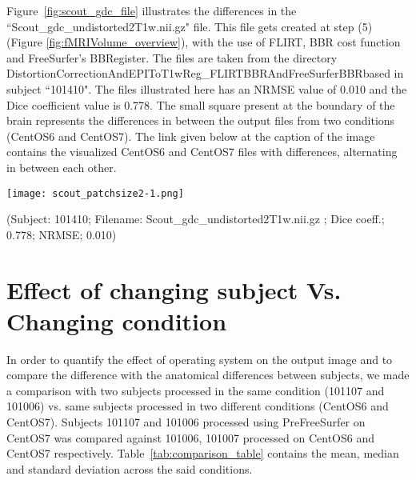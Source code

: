 Figure~\ref{fig:scout_gdc_file} illustrates the differences in the ``Scout\_gdc\_undistorted2T1w.nii.gz" file. This file gets created at step (5) (Figure \ref{fig:fMRIVolume_overview}), with the use of FLIRT, BBR cost function and FreeSurfer's BBRegister. The files are taken from the directory DistortionCorrectionAndEPIToT1wReg\_FLIRTBBRAndFreeSurferBBRbased in subject ``101410". The files illustrated here has an NRMSE value of 0.010 and the Dice coefficient value is 0.778. The small square present at the boundary of the brain represents the differences in between the output files from two conditions (CentOS6 and CentOS7). The link given below at the caption of the image contains the visualized CentOS6 and CentOS7 files with differences, alternating in between each other.

\begin{center}
\texttt{[image: scout\_patchsize2-1.png]}%
\caption*{(Subject: 101410; Filename: Scout\_gdc\_undistorted2T1w.nii.gz ; Dice coeff.; 0.778; NRMSE; 0.010)}
\label{fig:scout_gdc_file}
\end{center}

\section{Effect of changing subject Vs. Changing condition}\label{sec:comparison}
In order to quantify the effect of operating system on the output image and to compare the difference with the anatomical differences between subjects, we made a comparison with two subjects processed in the same condition (101107 and 101006) vs. same subjects processed in two different conditions (CentOS6 and CentOS7). Subjects 101107 and 101006 processed using PreFreeSurfer on CentOS7 was compared against 101006, 101007 processed on CentOS6 and CentOS7 respectively. Table~\ref{tab:comparison_table} contains the mean, median and standard deviation across the said conditions.

